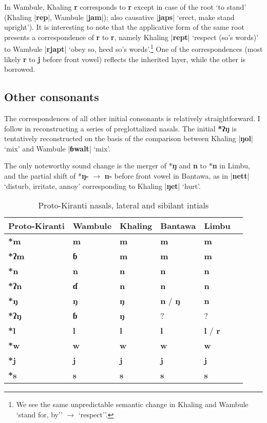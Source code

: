 \documentclass[oldfontcommands,oneside,a4paper,11pt]{article}
\newcommand{\ipa}[1]{\textbf{{\phon\mbox{#1}}}} %
\newcommand{\dhatu}[2]{|\ipa{#1}| `#2'}
\newcommand{\change}[2]{*\ipa{#1} $\rightarrow$ \ipa{#2}}
\begin{document}
In Wambule, Khaling \ipa{r} corresponds to \ipa{r} except in case of the root `to stand' (Khaling |\ipa{rep}|, Wambule  |\ipa{jam}|); also causative \dhatu{japs}{erect, make stand upright}). It is interesting to note that the applicative form of the same root presents a correspondence of \ipa{r} to \ipa{r}, namely Khaling \dhatu{rept}{respect (so's words)} to Wambule \dhatu{rjapt}{obey so, heed so's words}.\footnote{We see the same unpredictable semantic change in Khaling and Wambule `stand for, by'' $\rightarrow$ `respect''.} One of the correspondences (most likely \ipa{r} to \ipa{j} before front vowel) reflects the inherited layer, while the other is borrowed.  

\subsection{Other consonants}
The correspondences of all other initial consonants is relatively straightforward. I follow \citet{opgenort04implosives} in reconstructing a series of preglottalized nasals. The initial \ipa{*ʔŋ} is tentatively reconstructed on the basis of the comparison between Khaling \dhatu{ŋol}{mix} and Wambule \dhatu{ɓwalt}{mix}.

The only noteworthy sound change is the merger of *\ipa{ŋ} and \ipa{n} to *\ipa{n} in Limbu, and the partial shift of \change{ŋ-}{n-} before front vowel in Bantawa, as in \dhatu{nett}{disturb, irritate, annoy} corresponding to Khaling \dhatu{ŋet}{hurt}.

\begin{table}[H]
\caption{Proto-Kiranti nasals, lateral and sibilant intials} \centering \label{tab:nasals}
\begin{tabular}{llllll}
\toprule
Proto-Kiranti & Wambule & Khaling & Bantawa & Limbu \\
\midrule
\ipa{*m} & \ipa{m} & \ipa{m} & \ipa{m} & \ipa{m}  \\
\ipa{*ʔm} & \ipa{ɓ} & \ipa{m} & \ipa{m} & \ipa{m}  \\
\ipa{*n} & \ipa{n} & \ipa{n} & \ipa{n} & \ipa{n}  \\
\ipa{*ʔn} & \ipa{ɗ} & \ipa{n} & \ipa{n} & \ipa{n}  \\
\ipa{*ŋ} & \ipa{ŋ} & \ipa{ŋ} & \ipa{n} / \ipa{ŋ} & \ipa{n}  \\
\ipa{*ʔŋ} &  \ipa{ɓ}  & \ipa{ŋ} & ? &?  \\
\ipa{*l} & \ipa{l} & \ipa{l} & \ipa{l} & \ipa{l} / \ipa{r} \\
\ipa{*w} & \ipa{w} & \ipa{w} & \ipa{w} & \ipa{w} \\
\ipa{*j} & \ipa{j} & \ipa{j} & \ipa{j} & \ipa{j} \\
\ipa{*s} & \ipa{s} & \ipa{s} & \ipa{s} & \ipa{s}  \\
\bottomrule
\end{tabular}
\end{table}
\end{document}

